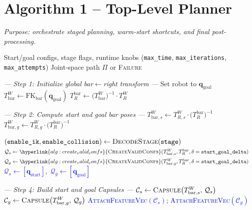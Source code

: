 \documentclass[11pt]{article}
\newcommand{\chg}[1]{\textcolor{blue}{#1}}
\newcommand{\AlgTarget}[1]{\hypertarget{#1}{}}
\newcommand{\AlgLink}[2]{\hyperlink{#1}{#2}}
\begin{document}
\section*{Algorithm 1 -- Top-Level Planner}
\noindent\textit{Purpose: orchestrate staged planning, warm-start shortcuts, and final post-processing.}
\AlgTarget{alg:plan}
\begin{algorithm}[H]
\caption{\textsc{Plan}($\mathbf{q}_{\text{start}},\, \mathbf{q}_{\text{goal}},\,\texttt{stage}$)}
\begin{algorithmic}[1]
\Require Start/goal configs, stage flags, runtime knobs (\texttt{max\_time}, \texttt{max\_iterations}, \texttt{max\_attempts})
\Ensure  Joint-space path $\Pi$ or \textsc{Failure}

\Statex \textit{--- Step 1: Initialize global bar$\leftarrow$right transform ---}
\State Set robot to $\mathbf{q}_{\text{goal}}$
\State $T_{\text{bar}}^{W} \gets \text{FK}_{\text{bar}}(\mathbf{q}_{\text{goal}})$
\State $T_{R}^{\text{bar}} \gets \bigl(T_{\text{bar}}^{W}\bigr)^{-1} \cdot T_{R}^{W}$
\quad{}

\Statex \textit{--- Step 2: Compute start and goal bar poses ---}
\State $T_{\text{bar},s}^{W} \gets T_{R,s}^{W} \cdot \bigl(T_{R}^{\text{bar}}\bigr)^{-1}$
\State $T_{\text{bar},g}^{W} \gets T_{R,g}^{W} \cdot \bigl(T_{R}^{\text{bar}}\bigr)^{-1}$

\State \chg{$(\texttt{enable\_ik},\texttt{enable\_collision}) \gets \textsc{DecodeStage}(\texttt{stage})$}
  \State \chg{$\mathcal{Q}_s \gets \AlgLink{alg:create_valid_confs}{\textsc{CreateValidConfs}}(T_{\text{bar},s}^{W}, T_{R}^{\text{bar}}, \delta=\texttt{start\_goal\_delta})$}
  \State \chg{$\mathcal{Q}_g \gets \AlgLink{alg:create_valid_confs}{\textsc{CreateValidConfs}}(T_{\text{bar},g}^{W}, T_{R}^{\text{bar}}, \delta=\texttt{start\_goal\_delta})$}
\Else
  \State \chg{$\mathcal{Q}_s \gets [\mathbf{q}_{\text{start}}],\; \mathcal{Q}_g \gets [\mathbf{q}_{\text{goal}}]$}
\EndIf

\Statex \textit{--- Step 4: Build start and goal Capsules ---}
\State $\mathcal{C}_s \gets \textsc{Capsule}\!\left(T_{\text{bar},s}^{W},\, \mathcal{Q}_s\right)$
\State $\mathcal{C}_g \gets \textsc{Capsule}\!\left(T_{\text{bar},g}^{W},\, \mathcal{Q}_g\right)$
\State \chg{\textsc{AttachFeatureVec}$(\mathcal{C}_s)$;\; \textsc{AttachFeatureVec}$(\mathcal{C}_g)$}


\end{algorithmic}
\end{algorithm}
\end{document}

